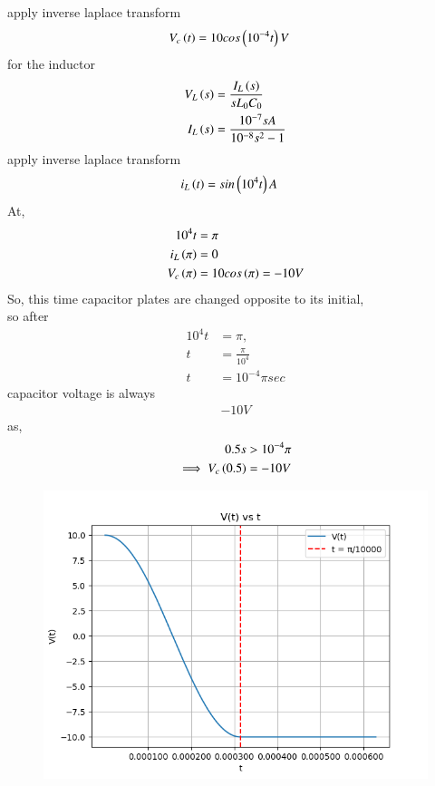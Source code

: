 \documentclass[journal,12pt,twocolumn]{IEEEtran}
\theoremstyle{remark}
\begin{document}
apply inverse laplace transform
\begin{align}
    V_c\left(t\right)&=10cos\left(10^{-4}t\right)V
\end{align} 
for the inductor
\begin{align}
    V_{L}\left(s\right)&=\frac{I_L\left(s\right)}{sL_{0}C_{0}}\\ 
    I_L\left(s\right)&=\frac{10^{-7}sA}{10^{-8}s^2-1}
\end{align}
apply inverse laplace transform
\begin{align}
    i_L\left(t\right)&=sin\left(10^4t\right)A
    \end{align}
    At,
    \begin{align}
    10^4t&=\pi\\
    i_L\left(\pi\right)&=0\\
    V_{c}\left(\pi\right)&=10cos\left(\pi\right)=-10V
\end{align}
So, this time capacitor plates are changed opposite to its initial,\\
so after \begin{align}
10^4t&=\pi,\\
t&=\frac{\pi}{10^4}\\
t&=10^{-4}\pi sec 
\end{align}
 capacitor voltage is always
\begin{align}
    -10V
\end{align}
as,
\begin{align}
0.5s&>10^{-4}\pi\\
\implies V_{c}\left(0.5\right)&=-10V
\end{align}
\begin{figure}[th]
\centering
\includegraphics[width=\linewidth]{2022/IN/62/figs/graph.png}
\end{figure}
\end{document}
